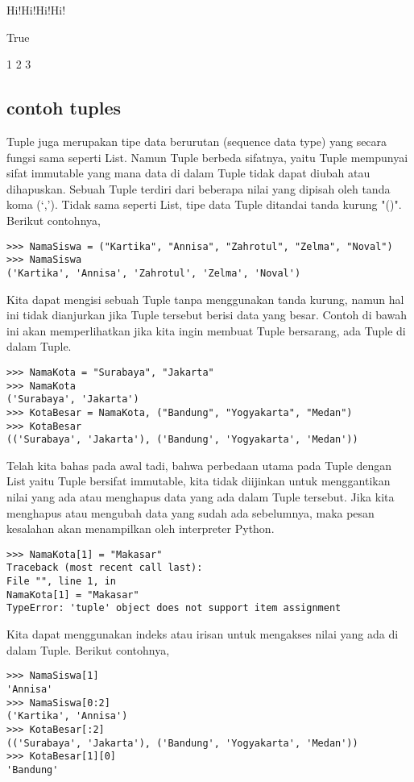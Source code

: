 Hi!Hi!Hi!Hi! 

True 

1
2
3
\subsection {contoh tuples}
Tuple juga merupakan tipe data berurutan (sequence data type) yang secara fungsi sama seperti List. Namun Tuple berbeda sifatnya, yaitu Tuple mempunyai sifat immutable yang mana data di dalam Tuple tidak dapat diubah atau dihapuskan. Sebuah Tuple terdiri dari beberapa nilai yang dipisah oleh tanda koma (‘,’). Tidak sama seperti List, tipe data Tuple ditandai  tanda kurung "()". Berikut contohnya,
\begin{verbatim}
>>> NamaSiswa = ("Kartika", "Annisa", "Zahrotul", "Zelma", "Noval")
>>> NamaSiswa
('Kartika', 'Annisa', 'Zahrotul', 'Zelma', 'Noval')
\end{verbatim}

Kita dapat mengisi sebuah Tuple tanpa menggunakan tanda kurung, namun hal ini tidak dianjurkan jika Tuple tersebut berisi data yang besar. Contoh di bawah ini akan memperlihatkan jika kita ingin membuat Tuple bersarang, ada Tuple di dalam Tuple.
\begin{verbatim}
>>> NamaKota = "Surabaya", "Jakarta"
>>> NamaKota
('Surabaya', 'Jakarta')
>>> KotaBesar = NamaKota, ("Bandung", "Yogyakarta", "Medan")
>>> KotaBesar
(('Surabaya', 'Jakarta'), ('Bandung', 'Yogyakarta', 'Medan'))
\end{verbatim}

Telah kita bahas pada awal tadi, bahwa perbedaan utama pada Tuple dengan List yaitu Tuple bersifat immutable, kita tidak diijinkan untuk menggantikan nilai yang ada atau menghapus data yang ada dalam Tuple tersebut. Jika kita menghapus atau mengubah data yang sudah ada sebelumnya, maka pesan kesalahan akan menampilkan oleh interpreter Python.
\begin{verbatim}
>>> NamaKota[1] = "Makasar"
Traceback (most recent call last):
File "", line 1, in
NamaKota[1] = "Makasar"
TypeError: 'tuple' object does not support item assignment
\end{verbatim}

Kita dapat menggunakan indeks atau irisan untuk mengakses nilai yang ada di dalam Tuple. Berikut contohnya,
\begin{verbatim}
>>> NamaSiswa[1]
'Annisa'
>>> NamaSiswa[0:2]
('Kartika', 'Annisa')
>>> KotaBesar[:2]
(('Surabaya', 'Jakarta'), ('Bandung', 'Yogyakarta', 'Medan'))
>>> KotaBesar[1][0]
'Bandung'
\end{verbatim}

